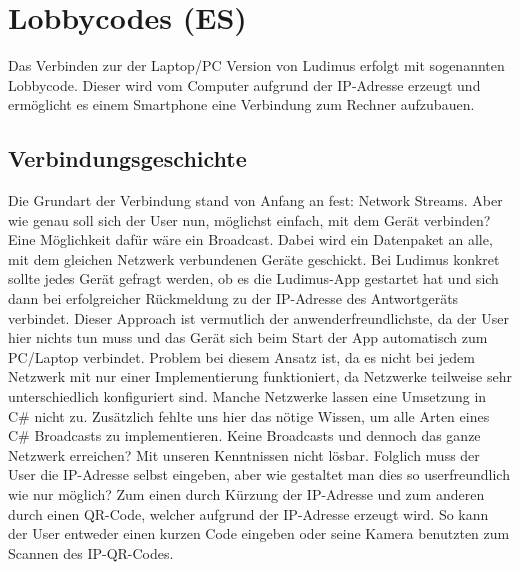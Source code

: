 \section{Lobbycodes (ES)} \label{lobbycodes}
Das Verbinden zur der Laptop/PC Version von Ludimus erfolgt mit sogenannten Lobbycode. Dieser wird vom Computer aufgrund der IP-Adresse erzeugt und ermöglicht es einem Smartphone eine Verbindung zum Rechner aufzubauen.
\subsection{Verbindungsgeschichte}
Die Grundart der Verbindung stand von Anfang an fest: Network Streams. Aber wie genau soll sich der User nun, möglichst einfach, mit dem Gerät verbinden? Eine Möglichkeit dafür wäre ein Broadcast. Dabei wird ein Datenpaket an alle, mit dem gleichen Netzwerk verbundenen Geräte geschickt. Bei Ludimus konkret sollte jedes Gerät gefragt werden, ob es die Ludimus-App gestartet hat und sich dann bei erfolgreicher Rückmeldung zu der IP-Adresse des Antwortgeräts verbindet. Dieser Approach ist vermutlich der anwenderfreundlichste, da der User hier nichts tun muss und das Gerät sich beim Start der App automatisch zum PC/Laptop verbindet. 
Problem bei diesem Ansatz ist, da es nicht bei jedem Netzwerk mit nur einer Implementierung funktioniert, da Netzwerke teilweise sehr unterschiedlich konfiguriert sind. Manche Netzwerke lassen eine Umsetzung in C\# nicht zu. Zusätzlich fehlte uns hier das nötige Wissen, um alle Arten eines C\# Broadcasts zu implementieren. Keine Broadcasts und dennoch das ganze Netzwerk erreichen? Mit unseren Kenntnissen nicht lösbar. Folglich muss der User die IP-Adresse selbst eingeben, aber wie gestaltet man dies so userfreundlich wie nur möglich? Zum einen durch Kürzung der IP-Adresse und zum anderen durch einen QR-Code, welcher aufgrund der IP-Adresse erzeugt wird. So kann der User entweder einen kurzen Code eingeben oder seine Kamera benutzten zum Scannen des IP-QR-Codes.
